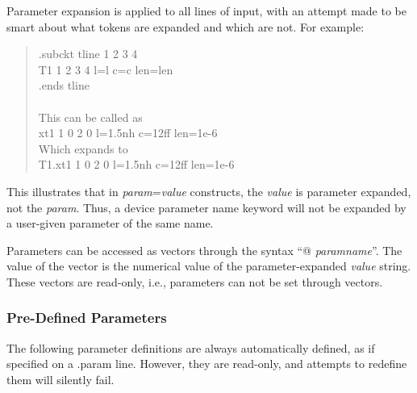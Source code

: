 Parameter expansion is applied to all lines of input, with an 
attempt made to be smart about what tokens are expanded and which
are not.  For example:
\begin{quote}{\vt
.subckt tline 1 2 3 4\\
T1 1 2 3 4 l=l c=c len=len\\
.ends tline}\\\\
This can be called as\\
{\vt xt1 1 0 2 0 l=1.5nh c=12ff len=1e-6}\\
Which expands to\\
{\vt T1.xt1 1 0 2 0 l=1.5nh c=12ff len=1e-6}
\end{quote}

This illustrates that in {\it param\/}={\it value} constructs, the
{\it value} is parameter expanded, not the {\it param\/}.  Thus, a
device parameter name keyword will not be expanded by a user-given
parameter of the same name.

Parameters can be accessed as vectors through the syntax ``{\vt @}{\it
paramname}''.  The value of the vector is the numerical value of the
parameter-expanded {\it value} string.  These vectors are read-only,
i.e., parameters can not be set through vectors.

\subsubsection{Pre-Defined Parameters}

The following parameter definitions are always automatically defined,
as if specified on a {\vt .param} line.  However, they are read-only,
and attempts to redefine them will silently fail.

